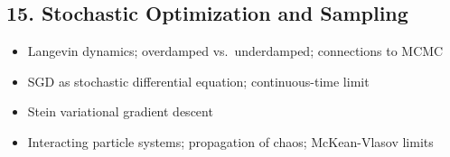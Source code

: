 \subsection{15. Stochastic Optimization and Sampling}
\begin{itemize}
\item Langevin dynamics; overdamped vs.\ underdamped; connections to MCMC
\item SGD as stochastic differential equation; continuous-time limit
\item Stein variational gradient descent
\item Interacting particle systems; propagation of chaos; McKean-Vlasov limits
\end{itemize}
